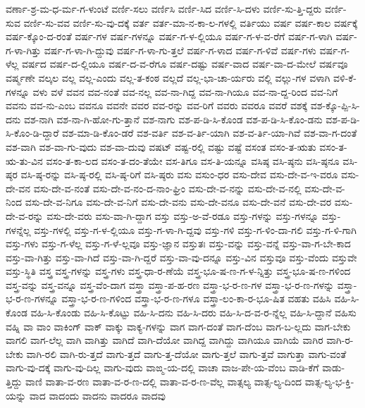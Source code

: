 {ವರ್ಣಾ-ಶ್ರ-ಮ-ಧ-ರ್ಮ-ಗ-ಳುಂಟೆ
ವರ್ಣಿ-ಸಲು
ವರ್ಣಿಸಿ
ವರ್ಣಿ-ಸಿದ
ವರ್ಣಿ-ಸಿ-ದಳು
ವರ್ಣಿ-ಸು-ತ್ತಿ-ದ್ದರು
ವರ್ಣಿ-ಸುವ
ವರ್ಣಿ-ಸು-ವವ
ವರ್ಣಿ-ಸು-ವು-ದಕ್ಕೆ
ವರ್ತ
ವರ್ತ-ಮಾ-ನ-ಕಾ-ಲ-ಗಳಲ್ಲಿ
ವರ್ತಿಯು
ವರ್ಷ
ವರ್ಷ-ಕಾಲ
ವರ್ಷಕ್ಕೆ
ವರ್ಷ-ಕ್ಕೊಂ-ದ-ರಂತೆ
ವರ್ಷ-ಗಳ
ವರ್ಷ-ಗಳನ್ನೂ
ವರ್ಷ-ಗ-ಳ-ಲ್ಲಿಯೂ
ವರ್ಷ-ಗ-ಳ-ವ-ರೆಗೆ
ವರ್ಷ-ಗ-ಳಾಗಿ
ವರ್ಷ-ಗ-ಳಾ-ಗಿತ್ತು
ವರ್ಷ-ಗ-ಳಾ-ಗಿ-ದ್ದುವು
ವರ್ಷ-ಗ-ಳಾ-ಗು-ತ್ತಲೆ
ವರ್ಷ-ಗ-ಳಾದ
ವರ್ಷ-ಗ-ಳಿವೆ
ವರ್ಷ-ಗಳು
ವರ್ಷ-ಗ-ಳೆಲ್ಲ
ವರ್ಷದ
ವರ್ಷ-ದ-ಲ್ಲಿಯೂ
ವರ್ಷ-ದ-ವ-ರೆಗೂ
ವರ್ಷ-ದಷ್ಟು
ವರ್ಷ-ವಾದ
ವರ್ಷ-ವಾ-ದ-ಮೇಲೆ
ವರ್ಷವೂ
ವರ್ಷ್ಮಣೇ
ವಲ್ಕಲ
ವಲ್ಲ
ವಲ್ಲ-ಎಂದು
ವಲ್ಲ-ತ-ಕಂಠ
ವಲ್ಲದೆ
ವಲ್ಲ-ಭಾ-ಚಾ-ರ್ಯರು
ವಲ್ಲಿ
ವಲ್ಲು-ಗಳ
ವಳಾಗಿ
ವಳಿ-ಕೆ-ಗಳನ್ನೂ
ವಳು
ವಳೆ
ವವನ
ವವ-ನಂತೆ
ವವ-ನಲ್ಲ
ವವ-ನಾ-ಗಿದ್ದ
ವವ-ನಾ-ಗಿಯೂ
ವವ-ನಾ-ದ್ದ-ರಿಂದ
ವವ-ನಿಗೆ
ವವನು
ವವ-ನು-ಎಂಬ
ವವನೂ
ವವನೇ
ವವರ
ವವ-ರನ್ನು
ವವ-ರಿಗೆ
ವವರು
ವವರೂ
ವವರೆ
ವಶಕ್ಕೆ
ವಶ-ಕ್ಕೊ-ಪ್ಪಿ-ಸಿ-ದನು
ವಶ-ನಾಗಿ
ವಶ-ನಾ-ಗಿ-ಹೋ-ಗು-ತ್ತಾನೆ
ವಶ-ನಾಗು
ವಶ-ಪ-ಡಿ-ಸಿ-ಕೊಂಡ
ವಶ-ಪ-ಡಿ-ಸಿ-ಕೊಂ-ಡನು
ವಶ-ಪ-ಡಿ-ಸಿ-ಕೊಂ-ಡಿ-ದ್ದಾರೆ
ವಶ-ಮಾ-ಡಿ-ಕೊಂ-ಡರೆ
ವಶ-ವರ್ತಿ
ವಶ-ವ-ರ್ತಿ-ಯಾಗಿ
ವಶ-ವ-ರ್ತಿ-ಯಾ-ಗಿವೆ
ವಶ-ವಾ-ಗ-ದಂತೆ
ವಶ-ವಾಗಿ
ವಶ-ವಾ-ಗು-ವುದು
ವಶ-ವಾ-ದುವು
ವಷಟ್
ವಷ್ಟ-ರಲ್ಲಿ
ವಷ್ಟು
ವಷ್ಟೆ
ವಸಂತ
ವಸಂ-ತ-ಋತು
ವಸಂ-ತ-ಋ-ತು-ವಿನ
ವಸಂ-ತ-ಕಾ-ಲದ
ವಸಂ-ತ-ದಂ-ತೆಯೇ
ವಸ-ತಿಗೂ
ವಸ-ತಿ-ಯನ್ನೂ
ವಸಿಷ್ಠ
ವಸಿ-ಷ್ಠನು
ವಸಿ-ಷ್ಠನೂ
ವಸಿ-ಷ್ಠರ
ವಸಿ-ಷ್ಠ-ರನ್ನು
ವಸಿ-ಷ್ಠ-ರಲ್ಲಿ
ವಸಿ-ಷ್ಠ-ರಿಗೆ
ವಸಿ-ಷ್ಠರು
ವಸು
ವಸುಂ-ಧರ
ವಸು-ದೇವ
ವಸು-ದೇ-ವ-ಇ-ವರೂ
ವಸು-ದೇ-ವನ
ವಸು-ದೇ-ವ-ನಂತೆ
ವಸು-ದೇ-ವ-ನಂ-ದ-ನಾಂ-ಘ್ರಿಂ
ವಸು-ದೇ-ವ-ನನ್ನು
ವಸು-ದೇ-ವ-ನಲ್ಲಿ
ವಸು-ದೇ-ವ-ನಿಂದ
ವಸು-ದೇ-ವ-ನಿಗೂ
ವಸು-ದೇ-ವ-ನಿಗೆ
ವಸು-ದೇ-ವನು
ವಸು-ದೇ-ವನೂ
ವಸು-ದೇ-ವನೆ
ವಸು-ದೇ-ವರ
ವಸು-ದೇ-ವ-ರನ್ನು
ವಸು-ದೇ-ವರು
ವಸು-ವಾ-ಗಿ-ದ್ದಾಗ
ವಸ್ತು
ವಸ್ತು-ಅ-ವೆ-ರಡೂ
ವಸ್ತು-ಗಳನ್ನು
ವಸ್ತು-ಗಳನ್ನೂ
ವಸ್ತು-ಗಳನ್ನೆಲ್ಲ
ವಸ್ತು-ಗಳಲ್ಲಿ
ವಸ್ತು-ಗ-ಳ-ಲ್ಲಿಯೂ
ವಸ್ತು-ಗ-ಳಾ-ಗಿ-ದ್ದವು
ವಸ್ತು-ಗಳಿ
ವಸ್ತು-ಗ-ಳಿಂ-ದಾ-ಗಲಿ
ವಸ್ತು-ಗ-ಳಿ-ಗಾಗಿ
ವಸ್ತು-ಗಳು
ವಸ್ತು-ಗ-ಳೆಲ್ಲ
ವಸ್ತು-ಗ-ಳೆ-ಲ್ಲವೂ
ವಸ್ತು-ಜ್ಞಾನ
ವಸ್ತುತಃ
ವಸ್ತು-ವನ್ನು
ವಸ್ತು-ವನ್ನೆ
ವಸ್ತು-ವಾ-ಗ-ಬೇ-ಕಾದ
ವಸ್ತು-ವಾ-ಗಿತ್ತು
ವಸ್ತು-ವಾ-ಗಿದೆ
ವಸ್ತು-ವಾ-ಗಿ-ದ್ದರೆ
ವಸ್ತು-ವಾ-ವು-ದನ್ನೂ
ವಸ್ತು-ವಿನ
ವಸ್ತುವೂ
ವಸ್ತು-ವೆಂದು
ವಸ್ತುವೇ
ವಸ್ತು-ಸ್ಥಿತಿ
ವಸ್ತ್ರ
ವಸ್ತ್ರ-ಗಳನ್ನು
ವಸ್ತ್ರ-ಗಳು
ವಸ್ತ್ರ-ಧಾ-ರ-ಣೆಯೆ
ವಸ್ತ್ರ-ಭೂ-ಷ-ಣ-ಗ-ಳ-ನ್ನಿತ್ತು
ವಸ್ತ್ರ-ಭೂ-ಷ-ಣ-ಗಳಿಂದ
ವಸ್ತ್ರ-ವನ್ನು
ವಸ್ತ್ರ-ವನ್ನೂ
ವಸ್ತ್ರ-ವೆಂ-ದಾಗ
ವಸ್ತ್ರಾ
ವಸ್ತ್ರಾ-ಪ-ಹ-ರಣ
ವಸ್ತ್ರಾ-ಭ-ರ-ಣ-ಗಳ
ವಸ್ತ್ರಾ-ಭ-ರ-ಣ-ಗಳನ್ನು
ವಸ್ತ್ರಾ-ಭ-ರ-ಣ-ಗಳನ್ನೂ
ವಸ್ತ್ರಾ-ಭ-ರ-ಣ-ಗಳಿಂದ
ವಸ್ತ್ರಾ-ಭ-ರ-ಣ-ಗಳೂ
ವಸ್ತ್ರಾ-ಲಂ-ಕಾ-ರ-ಭೂ-ಷಿತ
ವಹತು
ವಹಿಸಿ
ವಹಿ-ಸಿ-ಕೊಂಡ
ವಹಿ-ಸಿ-ಕೊಂಡು
ವಹಿ-ಸಿ-ಕೊಟ್ಟು
ವಹಿ-ಸಿ-ದನು
ವಹಿ-ಸಿ-ದರು
ವಹಿ-ಸಿ-ದ-ವ-ರ-ನ್ನೆಲ್ಲ
ವಹಿ-ಸಿ-ದ್ದಾನೆ
ವಹಿಸು
ವಹ್ನಿ
ವಾ
ವಾಂ
ವಾಕಿಂಗ್
ವಾಕ್
ವಾಕ್ಕು
ವಾಕ್ಯ-ಗಳನ್ನು
ವಾಗ
ವಾಗ-ದಂತೆ
ವಾಗ-ದೆಂಬ
ವಾಗ-ಬ-ಲ್ಲದು
ವಾಗ-ಬೇಕು
ವಾಗಲಿ
ವಾಗ-ಲೆಲ್ಲ
ವಾಗಿ
ವಾಗಿತ್ತು
ವಾಗಿದೆ
ವಾಗಿ-ದೆಯೋ
ವಾಗಿದ್ದ
ವಾಗಿದ್ದು
ವಾಗಿಯೂ
ವಾಗಿಯೆ
ವಾಗಿರ
ವಾಗಿ-ರ-ಬೇಕು
ವಾಗಿ-ರಲಿ
ವಾಗಿ-ರು-ತ್ತದೆ
ವಾಗು-ತ್ತದೆ
ವಾಗು-ತ್ತ-ದೆಯೋ
ವಾಗು-ತ್ತಲೆ
ವಾಗು-ತ್ತವೆ
ವಾಗುತ್ತಾ
ವಾಗು-ವಂತೆ
ವಾಗು-ವು-ದಕ್ಕೆ
ವಾಗು-ವು-ದಿಲ್ಲ
ವಾಗು-ವುದು
ವಾಙ್ಮ-ಯ-ದಲ್ಲಿ
ವಾಚಾ
ವಾಜ-ಪೇ-ಯ-ವೆಂಬ
ವಾಡಿ-ಕೆಗೆ
ವಾಡು-ತ್ತಿದ್ದು
ವಾಣಿ
ವಾತಾ-ವ-ರಣ
ವಾತಾ-ವ-ರ-ಣ-ದಲ್ಲಿ
ವಾತಾ-ವ-ರ-ಣ-ವೆಲ್ಲ
ವಾತ್ಸಲ್ಯ
ವಾತ್ಸ-ಲ್ಯ-ದಿಂದ
ವಾತ್ಸ-ಲ್ಯ-ಭ-ಕ್ತಿ-ಯನ್ನು
ವಾದ
ವಾದಂದು
ವಾದನು
ವಾದರೂ
ವಾದವು
}
